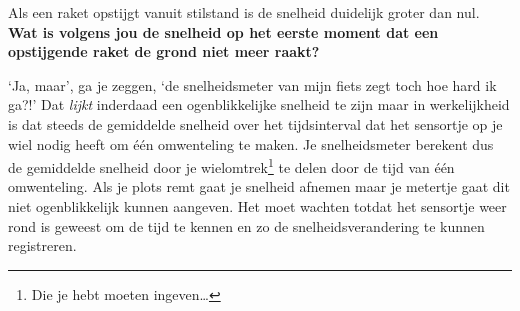 \documentclass{ximera}
\begin{document}
\begin{denkvraag*}{}
Als een raket opstijgt vanuit stilstand is de snelheid duidelijk groter dan nul. \textbf{Wat is volgens jou de snelheid op het eerste moment dat een opstijgende raket de grond niet meer raakt?}
\end{denkvraag*}


`Ja, maar', ga je zeggen, `de snelheidsmeter van mijn fiets zegt toch hoe hard ik ga?!' 
Dat \textit{lijkt} inderdaad een ogenblikkelijke snelheid te zijn maar in werkelijkheid is dat steeds de gemiddelde snelheid over het tijdsinterval dat het sensortje op je wiel nodig heeft om één omwenteling te maken. 
Je snelheidsmeter berekent dus de gemiddelde snelheid door je wielomtrek\footnote{Die je hebt moeten ingeven\ldots} te delen door de tijd van één omwenteling. 
Als je plots remt gaat je snelheid afnemen maar je metertje gaat dit niet ogenblikkelijk kunnen aangeven. 
Het moet wachten totdat het sensortje weer rond is geweest om de tijd te kennen en zo de snelheidsverandering te kunnen registreren.



\end{document}
